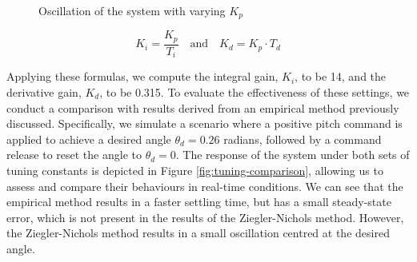 \documentclass[12pt]{article}
\begin{document}
\begin{figure}[ht]
\begin{subfigure}{.4\textwidth}
\end{subfigure}
    \caption{Oscillation of the system with varying $K_p$}
    \label{fig:zn-tuning}
\end{figure}

\begin{equation}
    \label{eq:pid-tuning-relationships}
    K_i = \frac{K_p}{T_i}
    \quad \text{and} \quad
    K_d = K_p \cdot T_d
\end{equation}

Applying these formulas, we compute the integral gain, \(K_i\), to be 14, and the derivative gain, \(K_d\), to be 0.315. To evaluate the effectiveness of these settings, we conduct a comparison with results derived from an empirical method previously discussed. Specifically, we simulate a scenario where a positive pitch command is applied to achieve a desired angle \(\theta_d = 0.26\) radians, followed by a command release to reset the angle to \(\theta_d = 0\). The response of the system under both sets of tuning constants is depicted in Figure \ref{fig:tuning-comparison}, allowing us to assess and compare their behaviours in real-time conditions. We can see that the empirical method results in a faster settling time, but has a small steady-state error, which is not present in the results of the Ziegler-Nichols method. However, the Ziegler-Nichols method results in a small oscillation centred at the desired angle. 
\end{document}
